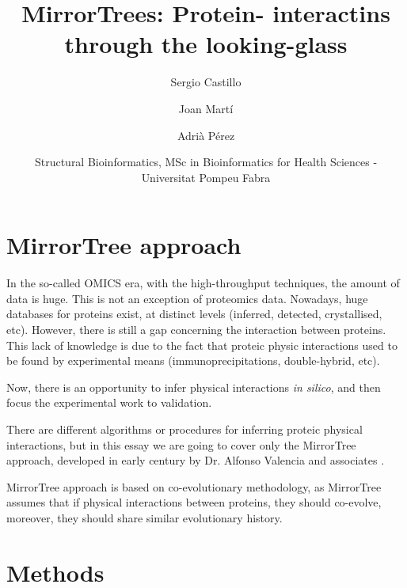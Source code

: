 \documentclass[11pt]{article}
\title{MirrorTrees: Protein-	interactins through the looking-glass}
\author{
	Sergio Castillo
	\and
	Joan Martí
	\and
	Adrià Pérez
}
\date{Structural Bioinformatics, MSc in Bioinformatics for Health Sciences - Universitat Pompeu Fabra}
\begin{document}
\maketitle

\section{MirrorTree approach}
In the so-called OMICS era, with the high-throughput techniques, the amount of data is huge. This is not an exception of proteomics data. Nowadays, huge databases for proteins exist, at distinct levels (inferred, detected, crystallised, etc). However, there is still a gap concerning the interaction between proteins. This lack of knowledge is due to the fact that proteic physic interactions used to be found by experimental means (immunoprecipitations, double-hybrid, etc).


Now, there is an opportunity to infer physical interactions \textit{in silico}, and then focus the experimental work to validation.

There are different algorithms or procedures for inferring proteic physical interactions, but in this essay we are going to cover only the MirrorTree approach, developed in early century by Dr. Alfonso Valencia and associates \cite{Pazos2001}.


MirrorTree approach is based on co-evolutionary methodology, as MirrorTree assumes that if physical interactions between proteins, they should co-evolve, moreover, they should share similar evolutionary history.



\section{Methods}
\end{document}
